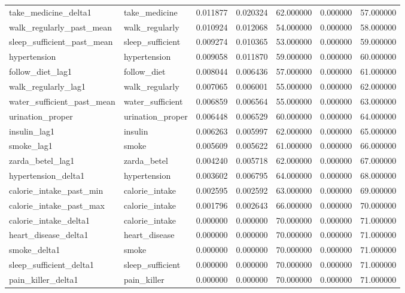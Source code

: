 \begin{longtable}{llrrrrr}
take\_medicine\_delta1 & take\_medicine & 0.011877 & 0.020324 & 62.000000 & 0.000000 & 57.000000 \\
walk\_regularly\_past\_mean & walk\_regularly & 0.010924 & 0.012068 & 54.000000 & 0.000000 & 58.000000 \\
sleep\_sufficient\_past\_mean & sleep\_sufficient & 0.009274 & 0.010365 & 53.000000 & 0.000000 & 59.000000 \\
hypertension & hypertension & 0.009058 & 0.011870 & 59.000000 & 0.000000 & 60.000000 \\
follow\_diet\_lag1 & follow\_diet & 0.008044 & 0.006436 & 57.000000 & 0.000000 & 61.000000 \\
walk\_regularly\_lag1 & walk\_regularly & 0.007065 & 0.006001 & 55.000000 & 0.000000 & 62.000000 \\
water\_sufficient\_past\_mean & water\_sufficient & 0.006859 & 0.006564 & 55.000000 & 0.000000 & 63.000000 \\
urination\_proper & urination\_proper & 0.006448 & 0.006529 & 60.000000 & 0.000000 & 64.000000 \\
insulin\_lag1 & insulin & 0.006263 & 0.005997 & 62.000000 & 0.000000 & 65.000000 \\
smoke\_lag1 & smoke & 0.005609 & 0.005622 & 61.000000 & 0.000000 & 66.000000 \\
zarda\_betel\_lag1 & zarda\_betel & 0.004240 & 0.005718 & 62.000000 & 0.000000 & 67.000000 \\
hypertension\_delta1 & hypertension & 0.003602 & 0.006795 & 64.000000 & 0.000000 & 68.000000 \\
calorie\_intake\_past\_min & calorie\_intake & 0.002595 & 0.002592 & 63.000000 & 0.000000 & 69.000000 \\
calorie\_intake\_past\_max & calorie\_intake & 0.001796 & 0.002643 & 66.000000 & 0.000000 & 70.000000 \\
calorie\_intake\_delta1 & calorie\_intake & 0.000000 & 0.000000 & 70.000000 & 0.000000 & 71.000000 \\
heart\_disease\_delta1 & heart\_disease & 0.000000 & 0.000000 & 70.000000 & 0.000000 & 71.000000 \\
smoke\_delta1 & smoke & 0.000000 & 0.000000 & 70.000000 & 0.000000 & 71.000000 \\
sleep\_sufficient\_delta1 & sleep\_sufficient & 0.000000 & 0.000000 & 70.000000 & 0.000000 & 71.000000 \\
pain\_killer\_delta1 & pain\_killer & 0.000000 & 0.000000 & 70.000000 & 0.000000 & 71.000000 \\

\end{longtable}
